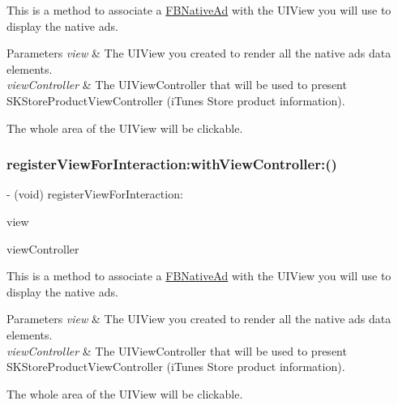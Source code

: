 This is a method to associate a \hyperlink{interfaceFBNativeAd}{F\+B\+Native\+Ad} with the U\+I\+View you will use to display the native ads.


\begin{DoxyParams}{Parameters}
{\em view} & The U\+I\+View you created to render all the native ads data elements. \\
\hline
{\em view\+Controller} & The U\+I\+View\+Controller that will be used to present S\+K\+Store\+Product\+View\+Controller (i\+Tunes Store product information).\\
\hline
\end{DoxyParams}
The whole area of the U\+I\+View will be clickable. \mbox{\label{interfaceFBNativeAd_af14f3514ad32a7b1b73ee6e94c1bba16}} 
\subsubsection{\texorpdfstring{register\+View\+For\+Interaction\+:with\+View\+Controller\+:()}{registerViewForInteraction:withViewController:()}\hspace{0.1cm}{\footnotesize\ttfamily [5/5]}}
{\footnotesize\ttfamily -\/ (void) register\+View\+For\+Interaction\+: \begin{DoxyParamCaption}\item[{(U\+I\+View $\ast$)}]{view }\item[{withViewController:(U\+I\+View\+Controller $\ast$)}]{view\+Controller }\end{DoxyParamCaption}}

This is a method to associate a \hyperlink{interfaceFBNativeAd}{F\+B\+Native\+Ad} with the U\+I\+View you will use to display the native ads.


\begin{DoxyParams}{Parameters}
{\em view} & The U\+I\+View you created to render all the native ads data elements. \\
\hline
{\em view\+Controller} & The U\+I\+View\+Controller that will be used to present S\+K\+Store\+Product\+View\+Controller (i\+Tunes Store product information).\\
\hline
\end{DoxyParams}
The whole area of the U\+I\+View will be clickable. \mbox{\label{interfaceFBNativeAd_ab3ebbc3b16c0c0be03becf7fcb204946}} 
